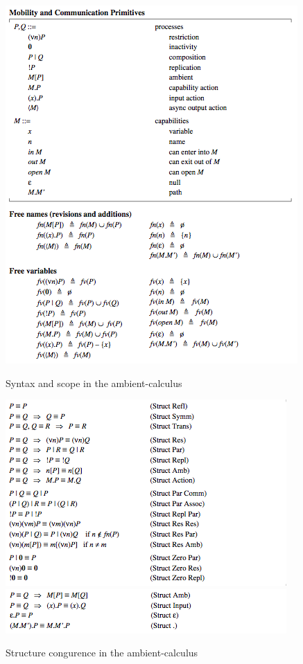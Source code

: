\begin{table} [p]
  \begin{center}
  \includegraphics[scale=1]{ambient.png}
  \end{center}
  \caption{Syntax and scope in the ambient-calculus}
  \label{ambient-syn}
\end{table}

\begin{table} [p]
  \begin{center}
  \includegraphics[scale=1]{ambient_str_1.png}
  \includegraphics[scale=1]{ambient_str_2.png}
  \end{center}
  \caption{Structure congurence in the ambient-calculus}
  \label{ambient-str}
\end{table}


